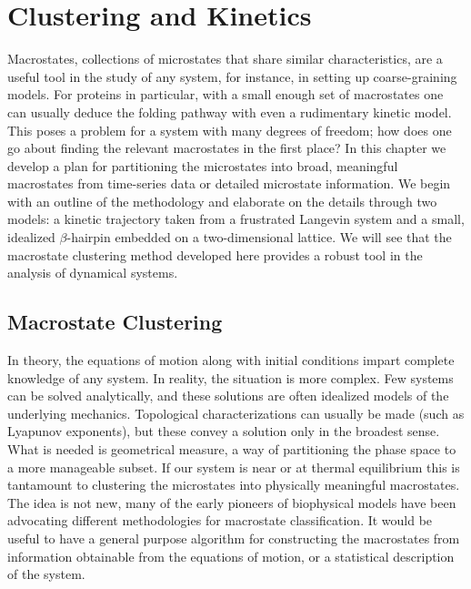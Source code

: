 \chapter{Clustering and Kinetics}
\label{chap:clustering_kinetics}

Macrostates, collections of microstates that share similar characteristics, are a useful tool in the study of any system, for instance, in setting up coarse-graining models. For proteins in particular, with a small enough set of macrostates one can usually deduce the folding pathway with even a rudimentary kinetic model. This poses a problem for a system with many degrees of freedom; how does one go about finding the relevant macrostates in the first place? In this chapter we develop a plan for partitioning the microstates into broad, meaningful macrostates from time-series data or detailed microstate information. We begin with an outline of the methodology and elaborate on the details through two models: a kinetic trajectory taken from a frustrated Langevin system and a small, idealized $\beta$-hairpin embedded on a two-dimensional lattice. We will see that the macrostate clustering method developed here provides a robust tool in the analysis of dynamical systems. 

\section{Macrostate Clustering}
\label{sec:clustering_outline}

In theory, the equations of motion along with initial conditions impart complete knowledge of any system. In reality, the situation is more complex. Few systems can be solved analytically, and these solutions are often idealized models of the underlying mechanics. Topological characterizations can usually be made (such as Lyapunov exponents), but these convey a solution only in the broadest sense. What is needed is geometrical measure, a way of partitioning the phase space to a more manageable subset. If our system is near or at thermal equilibrium this is tantamount to  clustering the microstates into physically meaningful macrostates. The idea is not new, many of the early pioneers of biophysical models have been advocating different methodologies for macrostate classification.\cite{ozkan_computing_2003, zhou_minimum-reaction-flux_2008} It would be useful to have a general purpose algorithm for constructing the macrostates from information obtainable from the equations of motion, or a statistical description of the system.

